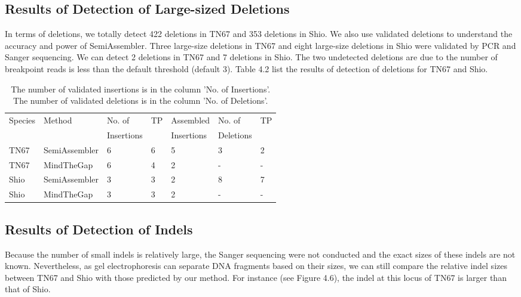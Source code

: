 \subsection{Results of Detection of Large-sized Deletions}
In terms of deletions, we totally detect 422 deletions in TN67 and 353 deletions in Shio. We also use validated deletions to understand the accuracy and power of SemiAssembler. Three large-size deletions in TN67 and eight large-size deletions in Shio were validated by PCR and Sanger sequencing. We can detect 2 deletions in TN67 and 7 deletions in Shio. The two undetected deletions are due to the number of breakpoint reads is less than the default threshold (default 3). Table 4.2 list the results of detection of deletions for TN67 and Shio.


\begin{table}[!ht]
    \centering
    \begin{tabular}[t]{l|llll|ll}
   Species  & Method & No. of  & TP & Assembled  &  No. of & TP\\
             &        &Insertions    & &Insertions  & Deletions & \\
      \hline
      
     TN67 & SemiAssembler & 6 & 6 & 5 & 3 & 2\\
     TN67  & MindTheGap & 6 & 4 & 2 & - & -\\
     Shio & SemiAssembler & 3 & 3 & 2 & 8 & 7\\
     Shio  & MindTheGap & 3 & 3 & 2 & - & -\\

      
   \end{tabular}
    \caption{The number of validated insertions is in the column 'No. of Insertions'. The number of validated deletions is in the column 'No. of Deletions'.}
    \label{}
\end{table}



\subsection{Results of Detection of Indels}

Because the number of small indels is relatively large, the Sanger sequencing were not conducted and the exact sizes of these indels are not known. Nevertheless, as gel electrophoresis can separate DNA fragments based on their sizes, we can still compare the relative indel sizes between TN67 and Shio with those predicted by our method. For instance (see Figure 4.6), the indel at this locus of TN67 is larger than that of Shio.

